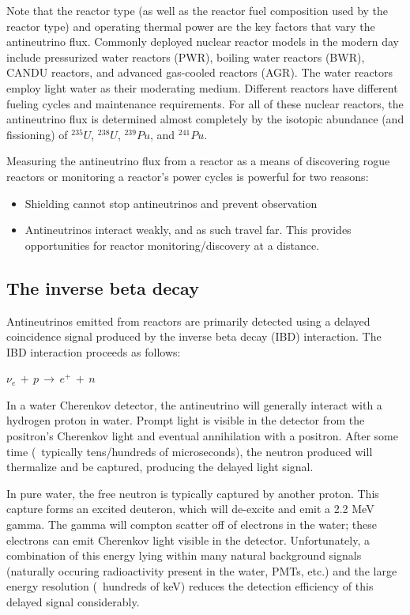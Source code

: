 \documentclass{article}
\begin{document}
Note that the reactor type (as well as the reactor fuel composition used by the
reactor type) and operating thermal power are the key factors that vary
the antineutrino flux. Commonly deployed nuclear reactor models in the modern 
day include pressurized water reactors (PWR), boiling water reactors (BWR),
CANDU reactors, and advanced gas-cooled reactors (AGR).  The water reactors
employ light water as their moderating medium.  Different reactors have
different fueling cycles and maintenance requirements.  For all of these
nuclear reactors, the antineutrino flux is determined almost completely by 
the isotopic abundance (and fissioning) of $^{235}U$, $^{238}U$, 
$^{239}Pu$, and $^{241}Pu$.


Measuring the antineutrino flux from a reactor as a means of discovering rogue
reactors or monitoring a reactor's power cycles is powerful for two reasons:
\begin{itemize}
\item{Shielding cannot stop antineutrinos and prevent observation}
\item{Antineutrinos interact weakly, and as such travel far.  This provides
    opportunities for reactor monitoring/discovery at a distance.}
\end{itemize}

\subsection{The inverse beta decay}
Antineutrinos emitted from reactors are primarily detected using a delayed
coincidence signal produced by the inverse beta decay (IBD) interaction.  
The IBD interaction proceeds as follows:

$\nu_{e} \, + \, p \, \rightarrow \, e^{+} \, + \, n$

In a water Cherenkov detector, the antineutrino will generally interact with
a hydrogen proton in water.  Prompt light is visible in the detector from the
positron's Cherenkov light and eventual annihilation with a positron.  After
some time (~typically tens/hundreds of microseconds), the neutron produced
will thermalize and be captured, producing the delayed light signal.


In pure water, the free neutron is typically captured by another proton.  This
capture forms an excited deuteron, which will de-excite and emit a 2.2 MeV
gamma.  The gamma will compton scatter off of electrons in the water; these
electrons can emit Cherenkov light visible in the detector.  Unfortunately,
a combination of this energy lying within many natural background signals 
(naturally occuring radioactivity present in the water, PMTs, etc.) and the
large energy resolution (~hundreds of keV) reduces the detection efficiency of
this delayed signal considerably.
\end{document}
